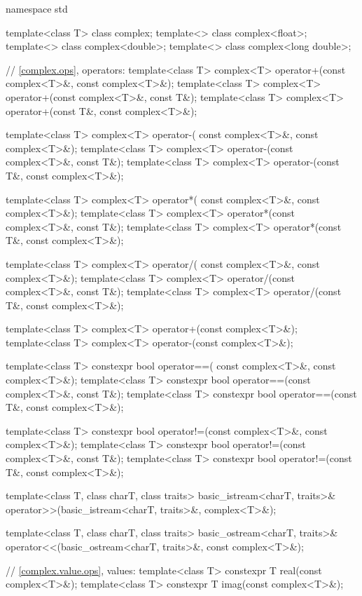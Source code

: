 %
\begin{codeblock}
namespace std {
  template<class T> class complex;
  template<> class complex<float>;
  template<> class complex<double>;
  template<> class complex<long double>;

  // \ref{complex.ops}, operators:
  template<class T>
    complex<T> operator+(const complex<T>&, const complex<T>&);
  template<class T> complex<T> operator+(const complex<T>&, const T&);
  template<class T> complex<T> operator+(const T&, const complex<T>&);

  template<class T> complex<T> operator-(
    const complex<T>&, const complex<T>&);
  template<class T> complex<T> operator-(const complex<T>&, const T&);
  template<class T> complex<T> operator-(const T&, const complex<T>&);

  template<class T> complex<T> operator*(
    const complex<T>&, const complex<T>&);
  template<class T> complex<T> operator*(const complex<T>&, const T&);
  template<class T> complex<T> operator*(const T&, const complex<T>&);

  template<class T> complex<T> operator/(
    const complex<T>&, const complex<T>&);
  template<class T> complex<T> operator/(const complex<T>&, const T&);
  template<class T> complex<T> operator/(const T&, const complex<T>&);

  template<class T> complex<T> operator+(const complex<T>&);
  template<class T> complex<T> operator-(const complex<T>&);

  template<class T> constexpr bool operator==(
    const complex<T>&, const complex<T>&);
  template<class T> constexpr bool operator==(const complex<T>&, const T&);
  template<class T> constexpr bool operator==(const T&, const complex<T>&);

  template<class T> constexpr bool operator!=(const complex<T>&, const complex<T>&);
  template<class T> constexpr bool operator!=(const complex<T>&, const T&);
  template<class T> constexpr bool operator!=(const T&, const complex<T>&);

  template<class T, class charT, class traits>
  basic_istream<charT, traits>&
  operator>>(basic_istream<charT, traits>&, complex<T>&);

  template<class T, class charT, class traits>
  basic_ostream<charT, traits>&
  operator<<(basic_ostream<charT, traits>&, const complex<T>&);

  // \ref{complex.value.ops}, values:
  template<class T> constexpr T real(const complex<T>&);
  template<class T> constexpr T imag(const complex<T>&);

}
\end{codeblock}
